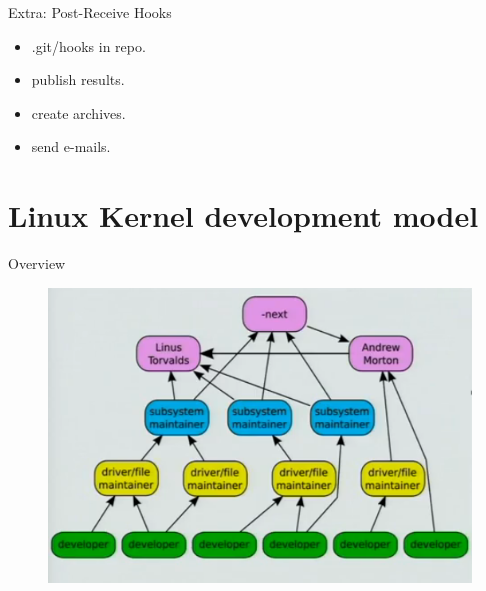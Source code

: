 \documentclass{workshop}
\begin{document}
\begin{frame}{Extra: Post-Receive Hooks}
\begin{itemize}
\item .git/hooks in repo.
\item publish results.
\item create archives.
\item send e-mails.
\end{itemize}
\end{frame}

\section{Linux Kernel development model}

\begin{frame}{Overview}
\begin{figure}
  \includegraphics[scale=0.6]{img/trees.png}
\end{figure}

\end{frame}
\end{document}
